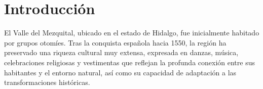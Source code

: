 \section{Introducción}





El Valle del Mezquital, ubicado en el estado de Hidalgo, fue inicialmente habitado por grupos otomíes. Tras la conquista española hacia 1550, la región ha preservado una riqueza cultural muy extensa, expresada en danzas, música, celebraciones religiosas y vestimentas que reflejan la profunda conexión entre sus habitantes y el entorno natural, así como su capacidad de adaptación a las transformaciones históricas.


